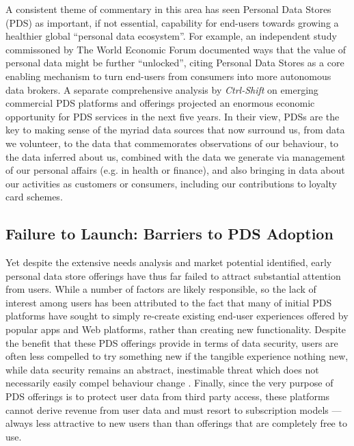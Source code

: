\documentclass[graybox]{svmult}
\begin{document}

A consistent theme of commentary in this area has seen Personal Data Stores (PDS) as important, if not essential, capability for end-users towards growing a healthier global ``personal data ecosystem''.  For example, an independent study commissoned by The World Economic Forum documented ways that the value of personal data might be further ``unlocked'', citing Personal Data Stores as a core enabling mechanism to turn end-users from consumers into more autonomous data brokers\cite{WEF-report}.  A separate comprehensive analysis by \emph{Ctrl-Shift} on emerging commercial PDS platforms and offerings projected an enormous economic opportunity for PDS services in the next five years\cite{ctrlshift}. In their view, PDSs are the key to making sense of the myriad data sources that now surround us, from data we volunteer, to the data that commemorates observations of our behaviour, to the data inferred about us, combined with the data we generate via management of our personal affairs (e.g. in health or finance), and also bringing in data about our activities as customers or consumers, including our contributions to loyalty card schemes.

\subsection{Failure to Launch: Barriers to PDS Adoption}

Yet despite the extensive needs analysis and market potential identified, early personal data store offerings have thus far failed to attract substantial attention from users.  While a number of factors are likely responsible, so the lack of interest among users has been attributed to the fact that many of initial PDS platforms have sought to simply re-create existing end-user experiences offered by popular apps and Web platforms, rather than creating new functionality.  Despite the benefit that these PDS offerings provide in terms of data security, users are often less compelled to try something new if the tangible experience nothing new, while data security remains an abstract, inestimable threat which does not necessarily easily compel behaviour change \cite{bandura1977self}.  Finally, since the very purpose of PDS offerings is to protect user data from third party access, these platforms cannot derive revenue from user data and must resort to subscription models --- always less attractive to new users than than offerings that are completely free to use. 
\end{document}
